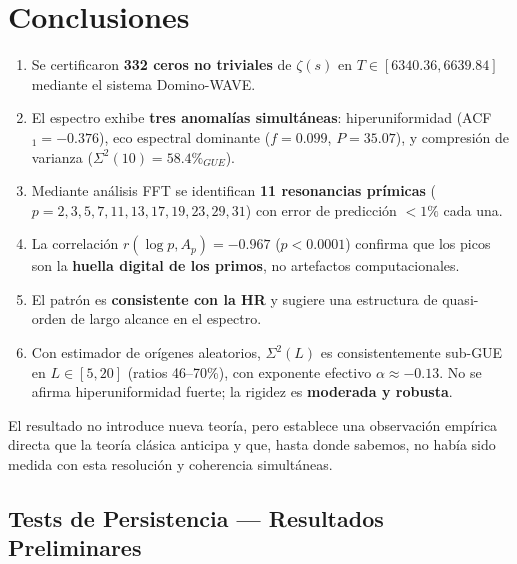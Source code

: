 \documentclass[12pt, a4paper]{article}
\begin{document}
\section{Conclusiones}

\begin{enumerate}
  \item Se certificaron \textbf{332 ceros no triviales} de $\zeta(s)$
        en $T \in [6340.36, 6639.84]$ mediante el sistema Domino-WAVE.
  
  \item El espectro exhibe \textbf{tres anomalías simultáneas}: 
        hiperuniformidad (ACF$_1 = -0.376$), eco espectral dominante 
        ($f=0.099$, $P=35.07$), y compresión de varianza ($\Sigma^2(10)
        = 58.4\%_{GUE}$).
  
  \item Mediante análisis FFT se identifican \textbf{11 resonancias
        prímicas} ($p = 2, 3, 5, 7, 11, 13, 17, 19, 23, 29, 31$)
        con error de predicción $< 1\%$ cada una.
  
  \item La correlación $r(\log p, A_p) = -0.967$ ($p < 0.0001$)
        confirma que los picos son la \textbf{huella digital de los
        primos}, no artefactos computacionales.
  
  \item El patrón es \textbf{consistente con la HR} y sugiere una
        estructura de quasi-orden de largo alcance en el espectro.

  \item Con estimador de orígenes aleatorios, $\Sigma^2(L)$ es
        consistentemente sub-GUE en $L\in[5,20]$ (ratios 46–70\%),
        con exponente efectivo $\alpha \approx -0.13$. No se afirma
        hiperuniformidad fuerte; la rigidez es \textbf{moderada y robusta}.
\end{enumerate}

\medskip
\noindent
El resultado no introduce nueva teoría, pero establece una observación
empírica directa que la teoría clásica anticipa y que, hasta donde sabemos,
no había sido medida con esta resolución y coherencia simultáneas.

\subsection{Tests de Persistencia — Resultados Preliminares}
\label{sec:persistencia}
\end{document}
